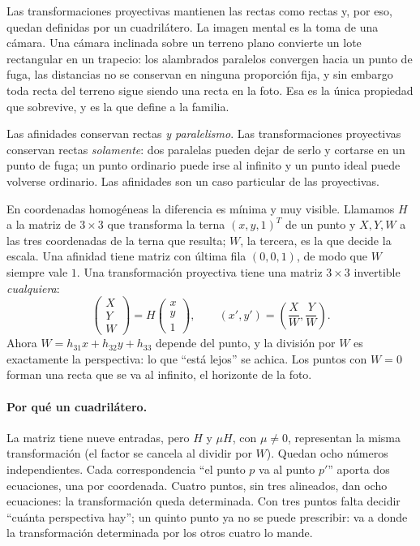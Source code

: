 {\small\vspace{1mm}\par}


Las transformaciones proyectivas mantienen las rectas como rectas y, por eso, quedan
definidas por un cuadrilátero. La imagen mental es la toma de una cámara. Una cámara inclinada sobre un
terreno plano convierte un lote rectangular en un trapecio: los alambrados paralelos
convergen hacia un punto de fuga, las distancias no se conservan en ninguna proporción fija,
y sin embargo toda recta del terreno sigue siendo una recta en la foto. Esa es la única
propiedad que sobrevive, y es la que define a la familia.

\begin{idea}
Las afinidades conservan rectas \emph{y paralelismo}. Las transformaciones proyectivas
conservan rectas \emph{solamente}: dos paralelas pueden dejar de serlo y cortarse en un punto
de fuga; un punto ordinario puede irse al infinito y un punto ideal puede volverse ordinario.
Las afinidades son un caso particular de las proyectivas.
\end{idea}

En coordenadas homogéneas la diferencia es mínima y muy visible. Llamamos \(H\) a la matriz
de \(3\times3\) que transforma la terna \((x,y,1)^T\) de un punto y \(X,Y,W\) a las tres
coordenadas de la terna que resulta; \(W\), la tercera, es la que decide la escala. Una
afinidad tiene matriz con última fila \((0,0,1)\), de modo que \(W\) siempre vale \(1\). Una transformación
proyectiva tiene una matriz \(3\times3\) invertible \emph{cualquiera}:
\[
\begin{pmatrix}X\\Y\\W\end{pmatrix}=H\begin{pmatrix}x\\y\\1\end{pmatrix},
\qquad
(x',y')=\left(\frac{X}{W},\frac{Y}{W}\right).
\]
Ahora \(W=h_{31}x+h_{32}y+h_{33}\) depende del punto, y la división por \(W\) es
exactamente la perspectiva: lo que \enquote{está lejos} se achica. Los puntos con \(W=0\) forman
una recta que se va al infinito, el horizonte de la foto.

\paragraph{Por qué un cuadrilátero.}
La matriz tiene nueve entradas, pero \(H\) y \(\mu H\), con \(\mu\neq0\), representan la misma
transformación (el factor se cancela al dividir por \(W\)). Quedan ocho números
independientes. Cada correspondencia \enquote{el punto \(p\) va al punto \(p'\)} aporta dos
ecuaciones, una por coordenada. Cuatro puntos, sin tres alineados, dan ocho ecuaciones: la
transformación queda determinada. Con tres puntos falta decidir \enquote{cuánta perspectiva hay};
un quinto punto ya no se puede prescribir: va a donde la transformación determinada por los
otros cuatro lo mande.

